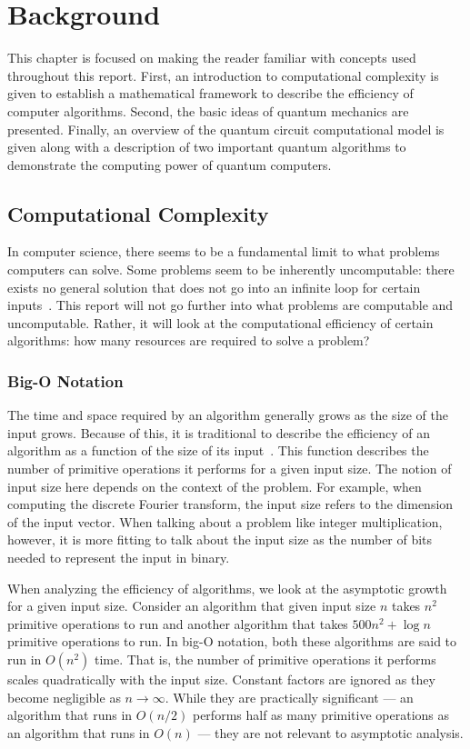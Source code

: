 \chapter{Background} \label{chap:background}
This chapter is focused on making the reader familiar with concepts used throughout this report.
First, an introduction to computational complexity is given to establish a mathematical framework to describe the efficiency of computer algorithms.
Second, the basic ideas of quantum mechanics are presented.
Finally, an overview of the quantum circuit computational model is given along with a description of two important quantum algorithms to demonstrate the computing power of quantum computers.

\section{Computational Complexity}
In computer science, there seems to be a fundamental limit to what problems computers can solve.
Some problems seem to be inherently uncomputable: there exists no general solution that does not go into an infinite loop for certain inputs~\cite{church1936note, turing1937computable}.
This report will not go further into what problems are computable and uncomputable.
Rather, it will look at the computational efficiency of certain algorithms: how many resources are required to solve a problem?

\subsection{Big-O Notation}
The time and space required by an algorithm generally grows as the size of the input grows.
Because of this, it is traditional to describe the efficiency of an algorithm as a function of the size of its input~\cite{cormen2009introduction}.
This function describes the number of primitive operations it performs for a given input size.
The notion of input size here depends on the context of the problem.
For example, when computing the discrete Fourier transform, the input size refers to the dimension of the input vector.
When talking about a problem like integer multiplication, however, it is more fitting to talk about the input size as the number of bits needed to represent the input in binary.

When analyzing the efficiency of algorithms, we look at the asymptotic growth for a given input size.
Consider an algorithm that given input size $n$ takes $n^2$ primitive operations to run and another algorithm that takes $500n^2 + \log n$ primitive operations to run.
In big-O notation, both these algorithms are said to run in $O(n^2)$ time.
That is, the number of primitive operations it performs scales quadratically with the input size.
Constant factors are ignored as they become negligible as $n \to \infty$.
While they are practically significant --- an algorithm that runs in $O(n/2)$ performs half as many primitive operations as an algorithm that runs in $O(n)$ --- they are not relevant to asymptotic analysis. 

